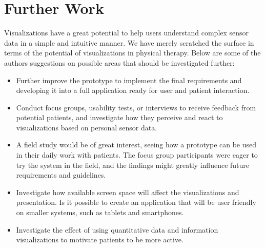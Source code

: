 \section{Further Work}
Visualizations have a great potential to help users understand complex sensor data in a simple and intuitive manner. We have merely scratched the surface in terms of the potential of visualizations in physical therapy. Below are some of the authors suggestions on possible areas that should be investigated further:

\begin{itemize}[itemsep=2pt]
  \item Further improve the  prototype to implement the final requirements and developing it into a full application ready for user and patient interaction.
  \item Conduct focus groups, usability tests, or interviews to receive feedback from potential patients, and investigate how they perceive and react to visualizations based on personal sensor data.
  \item A field study would be of great interest, seeing how a prototype can be used in their daily work with patients. The focus group participants were eager to try the system in the field, and the findings might greatly influence future requirements and guidelines.
  \item Investigate how available screen space will affect the visualizations and presentation. Is it possible to create an application that will be user friendly on smaller systems, such as tablets and smartphones.
  \item Investigate the effect of using quantitative data and information visualizations to motivate patients to be more active.
\end{itemize}

